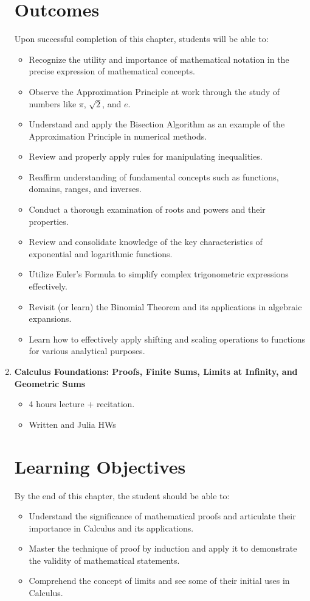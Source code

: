 \documentclass[letterpaper]{book}
\begin{document}
\begin{enumerate}[label={\large\arabic*}, font=\large]
\section*{Outcomes}
Upon successful completion of this chapter, students will be able to:
\begin{itemize}
    \item Recognize the utility and importance of mathematical notation in the precise expression of mathematical concepts.
    \item Observe the Approximation Principle at work through the study of numbers like \(\pi\), \(\sqrt{2}\), and \(e\).
    \item Understand and apply the Bisection Algorithm as an example of the Approximation Principle in numerical methods.
    \item Review and properly apply rules for manipulating inequalities.
    \item Reaffirm understanding of fundamental concepts such as functions, domains, ranges, and inverses.
    \item Conduct a thorough examination of roots and powers and their properties.
    \item Review and consolidate knowledge of the key characteristics of exponential and logarithmic functions.
    \item Utilize Euler's Formula to simplify complex trigonometric expressions effectively.
    \item Revisit (or learn) the Binomial Theorem and its applications in algebraic expansions.
    \item Learn how to effectively apply shifting and scaling operations to functions for various analytical purposes.
\end{itemize}

\bigskip

\item {\Large \bf Calculus Foundations: Proofs, Finite Sums, Limits at Infinity, and Geometric Sums}
\begin{itemize}
    \item 4 hours lecture + recitation.
    \item Written and Julia HWs
\end{itemize}

\section*{Learning Objectives}
By the end of this chapter, the student should be able to:
\begin{itemize}
    \item Understand the significance of mathematical proofs and articulate their importance in Calculus and its applications.
    \item Master the technique of proof by induction and apply it to demonstrate the validity of mathematical statements.
    \item Comprehend the concept of limits and see some of their initial uses in Calculus.
\end{itemize}



\end{enumerate}
\end{document}
